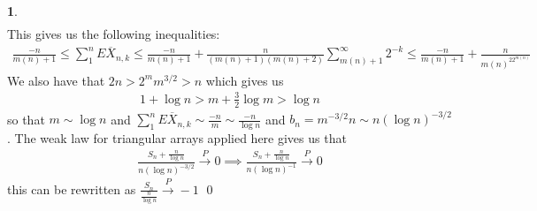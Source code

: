 \documentclass[10.5pt]{article}
\theoremstyle{definition}
\newtheorem{pb}{}
\begin{document}
\begin{pb}
\begin{align*}
        \end{align*}
        This gives us the following inequalities:
        \begin{align}
            \frac{-n}{m(n)+1} \leq \sum_1^n E \overline{X}_{n,k} \leq \frac{-n}{m(n)+1} + \frac{n}{(m(n)+1)(m(n)+2)}\sum_{m(n)+1}^\infty 2^{-k} \leq \frac{-n}{m(n)+1} + \frac{n}{m(n)^22^{m(n)}}
        \end{align}
        We also have that \(2n > 2^mm^{3/2}>n\) which gives us
        \begin{align}
            1 + \log n > m + \frac32 \log m > \log n
        \end{align}
        so that \(m \sim \log n\) and \(\sum_1^n E \overline{X}_{n,k} \sim \frac{-n}{m} \sim \frac{-n}{\log n}\) and \(b_n = m^{-3/2}n \sim n(\log n)^{-3/2}\). The weak law for triangular arrays applied here gives us that
        \begin{align*}
            \frac{S_n + \frac{n}{\log n}}{n(\log n)^{-3/2}} \overset{P}{\longrightarrow} 0 \implies \frac{S_n + \frac{n}{\log n}}{n(\log n)^{-1}} \overset{P}{\longrightarrow} 0
        \end{align*}
        this can be rewritten as \(\frac{S_n}{\frac{n}{\log n}} \overset{P}{\to} -1\) \qed
    \end{pb}
\end{document}
